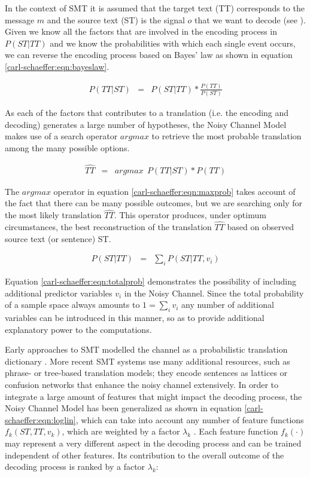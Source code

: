 \documentclass[output=paper]{LSP/langsci}
\begin{document}
In the context of SMT it is assumed that the target text (TT) corresponds to the message $m$ and the source text (ST) is the signal $o$ that we want to decode (see ). Given we know all the factors that are involved in the encoding process in $P(ST | TT)$ and we know the probabilities with which each single event occurs, we can reverse the encoding process based on Bayes' law as shown in equation \ref{carl-schaeffer:eqn:bayeslaw}. 

\begin{eqnarray} 
\label{carl-schaeffer:eqn:bayeslaw}
 P(TT|ST)  & =  &  P(ST|TT) * \frac{P(TT)}{P(ST)}
\end{eqnarray}

As each of the factors that contributes to a translation (i.e. the encoding and decoding) generates a large number of hypotheses, the Noisy Channel Model makes use of a search operator $argmax$ to retrieve the most probable translation among the many possible options. 

\begin{eqnarray} 
\label{carl-schaeffer:eqn:maxprob}
\widehat {TT}  & = & argmax~~P(TT |ST) * P(TT)
\end{eqnarray}

The $argmax$ operator in equation \ref{carl-schaeffer:eqn:maxprob} takes account of the fact that there can be many possible outcomes, but we are searching only for the most likely translation  $\widehat {TT}$. This operator produces, under optimum circumstances, the best reconstruction of the translation  $\widehat{TT}$ based on observed source text (or sentence) ST.

\begin{eqnarray} 
\label{carl-schaeffer:eqn:totalprob}
P(ST|TT)  & = & \sum_i P(ST|TT, v_i)
\end{eqnarray}


Equation \ref{carl-schaeffer:eqn:totalprob} demonstrates the possibility of including additional predictor variables  $v_i$ in the Noisy Channel. Since the total probability of a sample space always amounts to  $1=\sum _i v_i$ any number of additional variables can
be introduced in this manner, so as to provide additional explanatory power to the computations. 

Early approaches to SMT modelled the channel as a probabilistic translation dictionary \citep{Brown1988}. More recent SMT systems use many additional resources, such as phrase- or tree-based translation models; they encode sentences as lattices or confusion networks that enhance the noisy channel extensively. In order to integrate a large amount of features that might impact the decoding process, the Noisy Channel Model has been generalized as shown in equation \ref{carl-schaeffer:eqn:loglin}, which can take into account any number of feature functions $f_k(ST, TT,v_k)$, which are weighted by a factor  $\lambda _k$ \citep{Och2003}. Each feature function  $f_k(\cdot)$ may represent a very different aspect in the decoding process and can be trained independent of other features. Its contribution to the overall outcome of the decoding process is ranked by a factor  $\lambda _k$:
\end{document}
